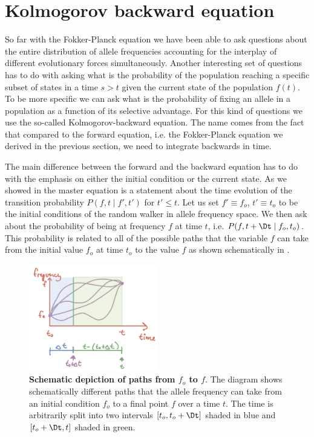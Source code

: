 \section{Kolmogorov backward equation}

So far with the Fokker-Planck equation we have been able to ask questions about
the entire distribution of allele frequencies accounting for the interplay of
different evolutionary forces simultaneously. Another interesting set of
questions has to do with asking what is the probability of the population
reaching a specific subset of states in a time $s > t$ given the current state
of the population $f(t)$. To be more specific we can ask what is the
probability of fixing an allele in a population as a function of its selective
advantage. For this kind of questions we use the so-called Kolmogorov-backward
equation. The name comes from the fact that compared to the forward equation,
i.e. the Fokker-Planck equation we derived in the previous section, we need to
integrate backwards in time.

The main difference between the forward and the backward equation has to do with
the emphasis on either the initial condition or the current state. As we showed
in  the master equation is a statement about the time
evolution of the transition probability $P(f, t \mid f', t')$ for $t' \leq t$.
Let us set $f' \equiv f_o$, $t' \equiv t_o$ to be the initial conditions of the
random walker in allele frequency space. We then ask about the probability of
being at frequency $f$ at time $t$, i.e. $P(f, t + \Dt \mid f_o, t_o)$. This
probability is related to all of the possible paths that the variable $f$ can
take from the initial value $f_o$ at time $t_o$ to the value $f$ as shown
schematically in .

\begin{figure}[h!]
	\centering \includegraphics[width=0.5\textwidth]
  {./fig/chapter_prob/05_00001.png}
	\caption{\textbf{Schematic depiction of paths from $f_o$ to $f$}. The diagram
  shows schematically different paths that the allele frequency can take from
  an initial condition $f_o$ to a final point $f$ over a time $t$. The
  time is arbitrarily split into two intervals $[t_o, t_o + \Dt]$ shaded in blue
	and $[t_o + \Dt, t]$ shaded in green.}
  \label{fig05_00001}
\end{figure}

